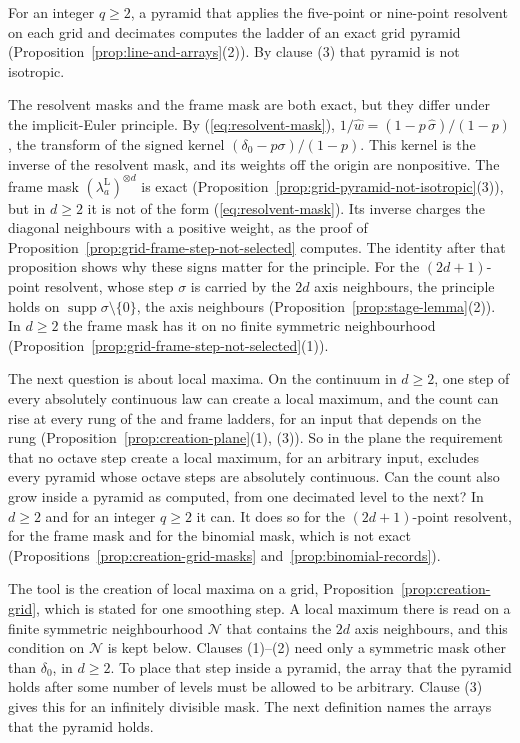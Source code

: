 For an integer $q \ge 2$, a pyramid that applies the five-point or nine-point resolvent on each
grid and decimates computes the ladder of an exact grid pyramid
(Proposition~\ref{prop:line-and-arrays}(2)). By clause (3) that pyramid is not isotropic.

The resolvent masks and the frame mask are both exact, but they differ under the implicit-Euler
principle. By (\ref{eq:resolvent-mask}), $1/\widehat w = (1 - p\,\widehat\sigma)/(1 - p)$, the
transform of the signed kernel $(\delta_0 - p\sigma)/(1-p)$. This kernel is the inverse of the
resolvent mask, and its weights off the origin are nonpositive. The frame mask
$(\lambda^{\mathrm L}_a)^{\otimes d}$ is exact (Proposition~\ref{prop:grid-pyramid-not-isotropic}(3)),
but in $d \ge 2$ it is not of the form (\ref{eq:resolvent-mask}). Its inverse charges the diagonal neighbours
with a positive weight, as the proof of Proposition~\ref{prop:grid-frame-step-not-selected}
computes. The identity after that proposition shows why these signs matter for the principle. For
the $(2d+1)$-point resolvent, whose step $\sigma$ is carried by the $2d$ axis neighbours, the
principle holds on $\operatorname{supp}\sigma \setminus \{0\}$, the axis neighbours
(Proposition~\ref{prop:stage-lemma}(2)). In $d \ge 2$ the frame mask has it on no finite symmetric
neighbourhood (Proposition~\ref{prop:grid-frame-step-not-selected}(1)).

The next question is about local maxima. On the continuum in $d \ge 2$, one step of every
absolutely continuous law can create a local maximum, and the count
can rise at every rung of the \Matern{} and frame \Matern{} ladders, for an input that depends on
the rung (Proposition~\ref{prop:creation-plane}(1), (3)). So in the plane the requirement that no
octave step create a local maximum, for an arbitrary input, excludes every pyramid whose octave
steps are absolutely continuous. Can the count also grow inside a pyramid as computed, from one decimated level to the next?
In $d \ge 2$ and for an integer $q \ge 2$ it can. It does so for the $(2d+1)$-point resolvent, for
the frame mask and for the binomial mask, which is not exact
(Propositions~\ref{prop:creation-grid-masks} and~\ref{prop:binomial-records}).

The tool is the creation of local maxima on a grid, Proposition~\ref{prop:creation-grid}, which is
stated for one smoothing step. A local maximum there is read on a finite symmetric neighbourhood
$\mathcal{N}$ that contains the $2d$ axis neighbours, and this condition on $\mathcal{N}$ is kept
below. Clauses (1)--(2) need only a symmetric mask other than $\delta_0$, in $d \ge 2$. To place
that step inside a pyramid, the array that the pyramid holds after some number of levels must be
allowed to be arbitrary. Clause (3) gives this for an infinitely divisible mask. The next
definition names the arrays that the pyramid holds.

